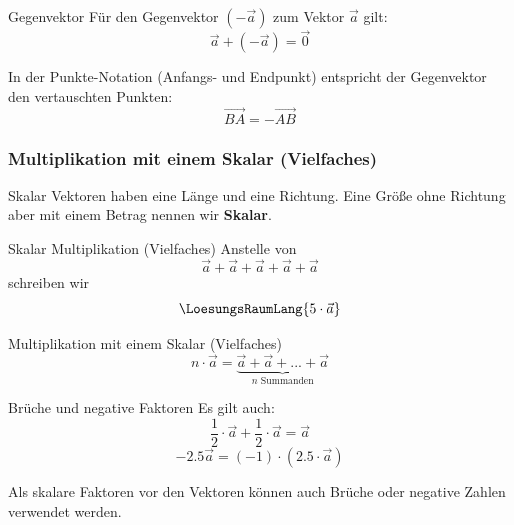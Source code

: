 \begin{bemerkung}{Gegenvektor}{}
  Für den Gegenvektor $(-\vec{a})$ zum Vektor $\vec{a}$ gilt:
  $$\vec{a} + (-\vec{a}) = \overrightarrow{0}$$
  
\end{bemerkung}


\begin{bemerkung}{}{}
  In der Punkte-Notation (Anfangs- und Endpunkt) entspricht der
  Gegenvektor  den vertauschten Punkten:
  $$\overrightarrow{BA} = - \overrightarrow{AB}$$
\end{bemerkung}


\newpage


\subsubsection{Multiplikation mit einem Skalar (Vielfaches)}
\begin{definition}{Skalar}{}
  Vektoren haben eine Länge und eine Richtung. Eine Größe ohne
  Richtung aber mit einem Betrag nennen wir \textbf{Skalar}. 
\end{definition}

\begin{beispiel}{Skalar Multiplikation (Vielfaches)}{}
  Anstelle von
  $$\vec{a}+\vec{a}+\vec{a}+\vec{a}+\vec{a}$$
  schreiben wir
  $$\LoesungsRaumLang{5\cdot{}\vec{a}}$$
\end{beispiel}

\begin{definition}{Multiplikation mit einem Skalar (Vielfaches)}{}
  $$n\cdot{}\vec{a} = \underbrace{\vec{a} + \vec{a} + ... + \vec{a}}_{n \text{ Summanden}}$$
\end{definition}


\begin{beispiel}{Brüche und negative Faktoren}{}
  Es gilt auch: 
  $$\frac12\cdot{}\vec{a} + \frac12\cdot{}\vec{a} = \vec{a}$$
  $$-2.5\vec{a} = (-1)\cdot{}\left(2.5\cdot{}\vec{a}\right)$$
  
  Als skalare Faktoren vor den Vektoren können auch Brüche oder
  negative Zahlen verwendet werden.
\end{beispiel}
\newpage

